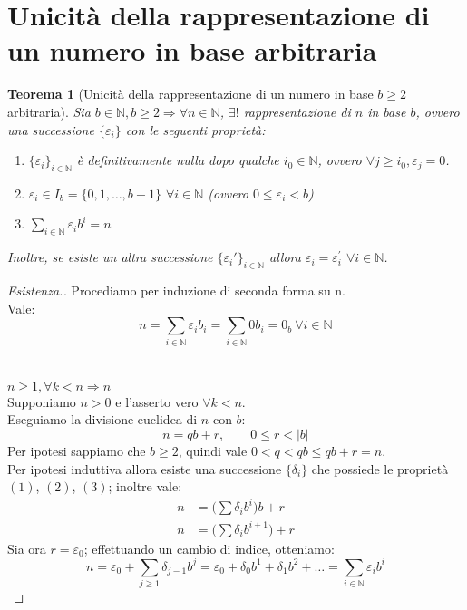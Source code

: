 \documentclass[12pt,twoscolu]{article}
\newcommand{\N}{\mathbb{N}}
\newcommand{\implica}{\Longrightarrow}
\newcommand{\nin}{\forall n\in\N}
\newcommand{\eps}{\varepsilon}
\newcommand{\pr}{\prime}
\renewcommand\qedsymbol{$\blacksquare$}
\newcommand{\baseinduz}[1]{\newline\newline {\boldmath$n = #1$}}
\newcommand{\induzdue}[1]{\\\\{\boldmath$n \ge #1, \forall k < n \implica n$}}
\newtheorem{theorem}{Teorema}
\begin{document}
\section{Unicità della rappresentazione di un numero in base arbitraria}
\begin{theorem}[Unicità della rappresentazione di un numero in base $b \ge 2$ arbitraria]
Sia $b \in \N, b \ge 2 \implica \nin$, $\exists!$ rappresentazione di $n$ in base $b$, ovvero una successione $\{\eps_{i}\}$ con le seguenti proprietà:
\begin{enumerate}
\item $\{\eps_i\}_{i\in\N}$ è definitivamente nulla dopo qualche $i_{0}\in\N$, ovvero $\forall j \ge i_{0}, \eps_{j} = 0$.
\item $\eps_i \in I_b = \{0, 1,\ldots ,b-1\}$ $\forall i \in \N$ (ovvero $0 \le \eps_i < b$)
\item $\displaystyle\sum_{i\in\N} \eps_{i}b^i = n$
\end{enumerate}
Inoltre, se esiste un altra successione $\{\eps_i'\}_{i\in\N}$ allora $\eps_i = \eps_{i}^{\pr}$ $\forall i \in \N$.
\end{theorem}

\renewcommand\qedsymbol{$\square$}
\begin{proof}[Esistenza.]
Procediamo per induzione di seconda forma su n.
\baseinduz{0}
\\Vale:
$$ n = \sum_{i\in\N} \eps_i b_i = \sum_{i\in\N} 0 b_i = 0_b \ \forall i \in\N$$
\induzdue{1}
\\Supponiamo $n > 0$ e l'asserto vero $\forall k < n$.
\\Eseguiamo la divisione euclidea di $n$ con $b$:
$$n = qb + r, \qquad0 \le r < |b|$$
Per ipotesi sappiamo che $b \ge 2$, quindi vale $ 0 < q < qb \le qb + r = n$.
\\Per ipotesi induttiva allora esiste una successione $\{\delta_i\}$ che possiede le proprietà $(1)$, $(2)$, $(3)$; inoltre vale:
\begin{align*}
n &= \Big(\sum \delta_i b^i\Big) b + r\\
n &= \Big(\sum \delta_i b^{i+1}\Big) + r
\end{align*}
Sia ora $r = \eps_0$; effettuando un cambio di indice, otteniamo:
$$ n = \eps_0 + \sum_{j \ge 1} \delta_{j-1}b^j = \eps_0 + \delta_0 b^1 + \delta_1 b^2 + \ldots = \sum_{i\in\N} \eps_i b^i $$
\end{proof}
\end{document}
